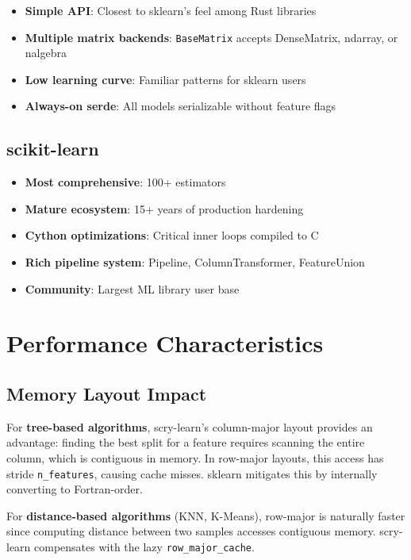 \documentclass[11pt,a4paper]{article}
\begin{document}
\begin{itemize}[itemsep=2pt]
\item \textbf{Simple API}: Closest to sklearn's feel among Rust libraries
\item \textbf{Multiple matrix backends}: \texttt{BaseMatrix} accepts DenseMatrix, ndarray, or nalgebra
\item \textbf{Low learning curve}: Familiar patterns for sklearn users
\item \textbf{Always-on serde}: All models serializable without feature flags
\end{itemize}

\subsection{scikit-learn}

\begin{itemize}[itemsep=2pt]
\item \textbf{Most comprehensive}: 100+ estimators
\item \textbf{Mature ecosystem}: 15+ years of production hardening
\item \textbf{Cython optimizations}: Critical inner loops compiled to C
\item \textbf{Rich pipeline system}: Pipeline, ColumnTransformer, FeatureUnion
\item \textbf{Community}: Largest ML library user base
\end{itemize}


\section{Performance Characteristics}

\subsection{Memory Layout Impact}

For \textbf{tree-based algorithms}, scry-learn's column-major layout provides an advantage: finding the best split for a feature requires scanning the entire column, which is contiguous in memory. In row-major layouts, this access has stride \texttt{n\_features}, causing cache misses. sklearn mitigates this by internally converting to Fortran-order.

For \textbf{distance-based algorithms} (KNN, K-Means), row-major is naturally faster since computing distance between two samples accesses contiguous memory. scry-learn compensates with the lazy \texttt{row\_major\_cache}.
\end{document}
